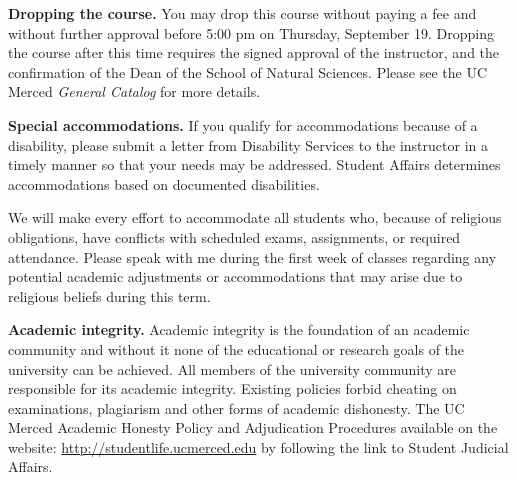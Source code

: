 \documentclass{article}
\newcommand{\secskip}{\vspace{6pt}}
\begin{document}
\begin{description}

\item \textbf{Dropping the course.} You may drop this course without
  paying a fee and without further approval before 5:00 pm on
  Thursday, September 19.  Dropping the course after this time
  requires the signed approval of the instructor, and the confirmation
  of the Dean of the School of Natural Sciences. Please see the UC
  Merced \textit{General Catalog} for more details.

\secskip

\item \textbf{Special accommodations.} If you qualify for
  accommodations because of a disability, please submit a letter from
  Disability Services to the instructor in a timely manner so that
  your needs may be addressed.  Student Affairs determines
  accommodations based on documented disabilities.

  We will make every effort to accommodate all students who, because
  of religious obligations, have conflicts with scheduled exams,
  assignments, or required attendance.  Please speak with me during
  the first week of classes regarding any potential academic
  adjustments or accommodations that may arise due to religious
  beliefs during this term.

\secskip

\item \textbf{Academic integrity.}  Academic integrity is the
  foundation of an academic community and without it none of the
  educational or research goals of the university can be achieved.
  All members of the university community are responsible for its
  academic integrity.  Existing policies forbid cheating on
  examinations, plagiarism and other forms of academic dishonesty.
  The UC Merced Academic Honesty Policy and Adjudication Procedures
  available on the website: \url{http://studentlife.ucmerced.edu} by
  following the link to Student Judicial Affairs.

\end{description}

\clearpage
\end{document}
